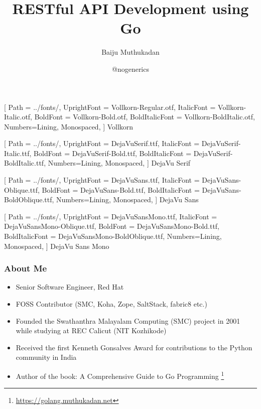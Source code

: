 \documentclass[aspectratio=169]{beamer}
\title{RESTful API Development using Go}
\author{Baiju Muthukadan}
\date{@nogenerics}
\begin{document}
\beamertemplatenavigationsymbolsempty

\setmainfont
[ Path = ../fonts/,
UprightFont = DejaVuSerif.ttf,
ItalicFont = DejaVuSerif-Italic.ttf,
BoldFont = DejaVuSerif-Bold.ttf,
BoldItalicFont = DejaVuSerif-BoldItalic.ttf,
Numbers={Lining, Monospaced},
] {DejaVu Serif}

\setsansfont
[ Path = ../fonts/,
UprightFont = DejaVuSans.ttf,
ItalicFont = DejaVuSans-Oblique.ttf,
BoldFont = DejaVuSans-Bold.ttf,
BoldItalicFont = DejaVuSans-BoldOblique.ttf,
Numbers={Lining, Monospaced},
] {DejaVu Sans}

\setmonofont
[ Path = ../fonts/,
UprightFont = DejaVuSansMono.ttf,
ItalicFont = DejaVuSansMono-Oblique.ttf,
BoldFont = DejaVuSansMono-Bold.ttf,
BoldItalicFont = DejaVuSansMono-BoldOblique.ttf,
Numbers={Lining, Monospaced},
] {DejaVu Sans Mono}


\newfontfamily{\vollkorn}
[ Path = ../fonts/,
UprightFont = Vollkorn-Regular.otf,
ItalicFont = Vollkorn-Italic.otf,
BoldFont = Vollkorn-Bold.otf,
BoldItalicFont = Vollkorn-BoldItalic.otf,
Numbers={Lining, Monospaced},
] {Vollkorn}

\newfontfamily{\dejavuserif}
[ Path = ../fonts/,
UprightFont = DejaVuSerif.ttf,
ItalicFont = DejaVuSerif-Italic.ttf,
BoldFont = DejaVuSerif-Bold.ttf,
BoldItalicFont = DejaVuSerif-BoldItalic.ttf,
Numbers={Lining, Monospaced},
] {DejaVu Serif}

\newfontfamily{\dejavusans}
[ Path = ../fonts/,
UprightFont = DejaVuSans.ttf,
ItalicFont = DejaVuSans-Oblique.ttf,
BoldFont = DejaVuSans-Bold.ttf,
BoldItalicFont = DejaVuSans-BoldOblique.ttf,
Numbers={Lining, Monospaced},
] {DejaVu Sans}

\newfontfamily{\dejavumono}
[ Path = ../fonts/,
UprightFont = DejaVuSansMono.ttf,
ItalicFont = DejaVuSansMono-Oblique.ttf,
BoldFont = DejaVuSansMono-Bold.ttf,
BoldItalicFont = DejaVuSansMono-BoldOblique.ttf,
Numbers={Lining, Monospaced},
] {DejaVu Sans Mono}

\frame{\titlepage}

\begin{frame}
  \frametitle{About Me}

  \begin{itemize}
  \item<1-> Senior Software Engineer, Red Hat
  \item<2-> FOSS Contributor (SMC, Koha, Zope, SaltStack, fabric8 etc.)
  \item<3-> Founded the Swathanthra Malayalam Computing (SMC) project in 2001 while studying at REC Calicut (NIT Kozhikode)
  \item<4-> Received the first Kenneth Gonsalves Award for contributions to the Python community in India
  \item<5-> Author of the book: A Comprehensive Guide to Go Programming \footnote{\url{https://golang.muthukadan.net}}
  \end{itemize}

\end{frame}
\end{document}
